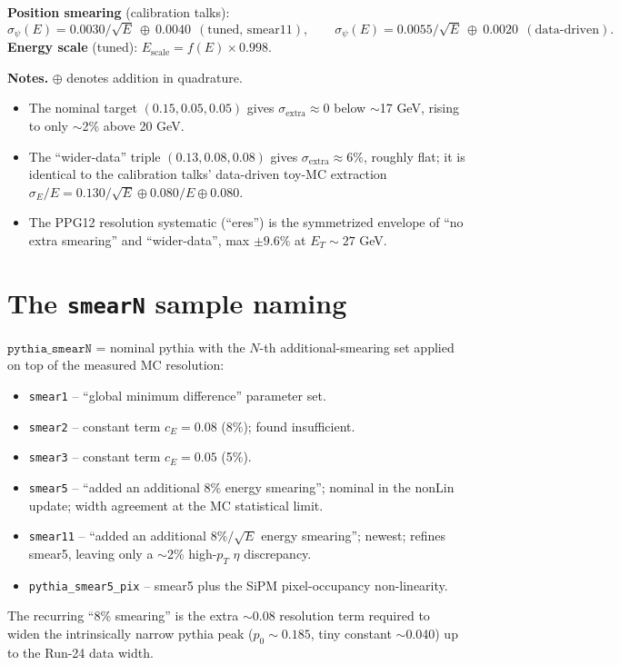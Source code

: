 \documentclass[11pt]{article}
\begin{document}
\textbf{Position smearing} (calibration talks):
\[
  \sigma_\psi(E) = 0.0030/\sqrt{E}\ \oplus\ 0.0040\ \ (\text{tuned, smear11}),
  \qquad
  \sigma_\psi(E) = 0.0055/\sqrt{E}\ \oplus\ 0.0020\ \ (\text{data-driven}).
\]
\textbf{Energy scale} (tuned): $E_{\text{scale}} = f(E)\times 0.998$.

\textbf{Notes.} $\oplus$ denotes addition in quadrature.
\begin{itemize}[nosep,leftmargin=1.4em]
  \item The nominal target $(0.15,0.05,0.05)$ gives $\sigma_{\text{extra}}\!\approx\!0$
        below $\sim$17 GeV, rising to only $\sim$2\% above 20 GeV.
  \item The ``wider-data'' triple $(0.13,0.08,0.08)$ gives $\sigma_{\text{extra}}\!\approx\!6\%$,
        roughly flat; it is identical to the calibration talks' data-driven toy-MC
        extraction $\sigma_E/E = 0.130/\sqrt{E}\oplus 0.080/E\oplus 0.080$.
  \item The PPG12 resolution systematic (``eres'') is the symmetrized envelope of
        ``no extra smearing'' and ``wider-data'', max $\pm 9.6\%$ at $E_T\!\sim\!27$ GeV.
\end{itemize}

\section{The \texttt{smearN} sample naming}
$\texttt{pythia\_smearN}$ = nominal pythia with the $N$-th additional-smearing set
applied on top of the measured MC resolution:
\begin{itemize}[nosep,leftmargin=1.4em]
  \item \texttt{smear1} -- ``global minimum difference'' parameter set.
  \item \texttt{smear2} -- constant term $c_E=0.08$ (8\%); found insufficient.
  \item \texttt{smear3} -- constant term $c_E=0.05$ (5\%).
  \item \texttt{smear5} -- ``added an additional 8\% energy smearing''; nominal in the
        nonLin update; width agreement at the MC statistical limit.
  \item \texttt{smear11} -- ``added an additional $8\%/\sqrt{E}$ energy smearing'';
        newest; refines smear5, leaving only a $\sim$2\% high-$p_T$ $\eta$ discrepancy.
  \item \texttt{pythia\_smear5\_pix} -- smear5 plus the SiPM pixel-occupancy non-linearity.
\end{itemize}
The recurring ``8\% smearing'' is the extra $\sim$0.08 resolution term required to
widen the intrinsically narrow pythia peak ($p_0\!\sim\!0.185$, tiny constant
$\sim$0.040) up to the Run-24 data width.
\end{document}

